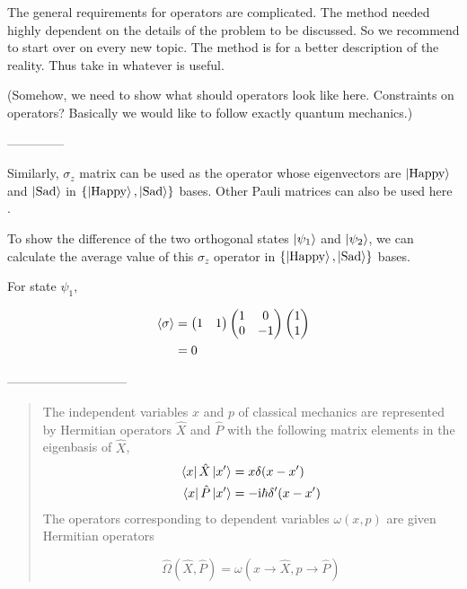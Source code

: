 \documentclass[%
 aip,
 jmp,%
 amsmath,amssymb,
 reprint,%
]{revtex4-1}
\begin{document}
The general requirements for operators are complicated. The method needed highly dependent on the details of the problem to be discussed. So we recommend to start over on every new topic. The method is for a better description of the reality. Thus take in whatever is useful.



(Somehow, we need to show what should operators look like here. Constraints on operators? Basically we would like to follow exactly quantum mechanics.)







--------------

Similarly, $\sigma_z$ matrix can be used as the operator whose eigenvectors are $\left| \mathrm{Happy}\right\rangle$ and $\left| \mathrm{Sad}\right\rangle$ in $\{\left| \mathrm{Happy}\right\rangle, \left| \mathrm{Sad}\right\rangle\}$ bases. Other Pauli matrices can also be used here . 

To show the difference of the two orthogonal states $\left| \psi_1\right\rangle$ and $\left| \psi_2\right\rangle$, we can calculate the average value of this $\sigma_z$ operator in $\{\left| \mathrm{Happy}\right\rangle, \left| \mathrm{Sad}\right\rangle\}$ bases.

For state $\psi_1$,

\begin{align}
\left< \sigma \right> &= \begin{pmatrix} 1 & 1 \end{pmatrix}
\begin{pmatrix}
1 & 0 \\
0 & -1
\end{pmatrix}
\begin{pmatrix}
1 \\ 1
\end{pmatrix} \\
& = 0
\end{align}









-----------------------------





\begin{quote}
The independent variables $x$ and $p$ of classical mechanics are represented by Hermitian operators $\hat X$ and $\hat P$ with the following matrix elements in the eigenbasis of $\hat X$,
\begin{align}
\left\langle x\right|\hat X\left| x'\right\rangle &= x\delta(x-x') \\
\left\langle x\right|\hat P\left| x'\right\rangle &= -\mathrm i \hbar \delta'(x-x')
\end{align}
The operators corresponding to dependent variables $\omega(x,p)$ are given Hermitian operators

\begin{equation}
\hat \Omega(\hat X, \hat P) = \omega(x\rightarrow \hat X, p \rightarrow \hat P)
\end{equation}

\end{quote}
\end{document}
